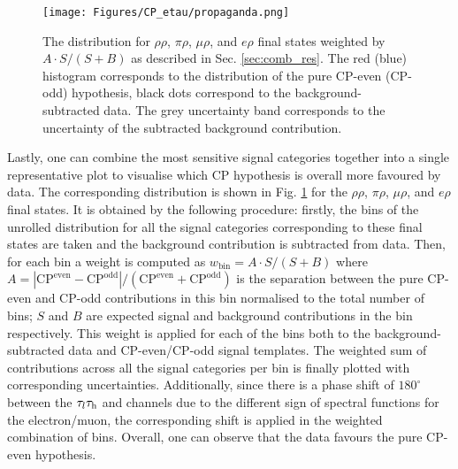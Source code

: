 \begin{figure}[h!]
    \centering
    \texttt{[image: Figures/CP\_etau/propaganda.png]}
    \caption{The \phicp distribution for $\rho\rho$, $\pi\rho$, $\mu\rho$, and $e\rho$ final states weighted by $A \cdot S/(S+B)$ as described in Sec. \ref{sec:comb_res}. The red (blue) histogram corresponds to the distribution of the pure CP-even (CP-odd) hypothesis, black dots correspond to the background-subtracted data. The grey uncertainty band corresponds to the uncertainty of the subtracted background contribution.}
    \label{fig:propaganda}
\end{figure}

Lastly, one can combine the most sensitive signal categories together into a single representative plot to visualise which CP hypothesis is overall more favoured by data. The corresponding distribution is shown in Fig. \ref{fig:propaganda} for the $\rho\rho$, $\pi\rho$, $\mu\rho$, and $e\rho$ final states. It is obtained by the following procedure: firstly, the bins of the unrolled \phicp distribution for all the signal categories corresponding to these final states are taken and the background contribution is subtracted from data. Then, for each bin a weight is computed as $w_\text{bin} = A \cdot S/(S+B)$ where $A = |\text{CP}^\text{even} - \text{CP}^\text{odd}| / (\text{CP}^\text{even} + \text{CP}^\text{odd})$ is the separation between the pure CP-even and CP-odd contributions in this bin normalised to the total number of bins; $S$ and $B$ are expected signal and background contributions in the bin respectively. This weight is applied for each of the bins both to the background-subtracted data and CP-even/CP-odd signal templates. The weighted sum of contributions across all the signal categories per \phicp bin is finally plotted with corresponding uncertainties. Additionally, since there is a phase shift of $180^\circ$ between the $\tau_l\tau_\mathrm{h}$ and \tata channels due to the different sign of spectral functions for the electron/muon, the corresponding shift is applied in the weighted combination of bins. Overall, one can observe that the data favours the pure CP-even hypothesis. 